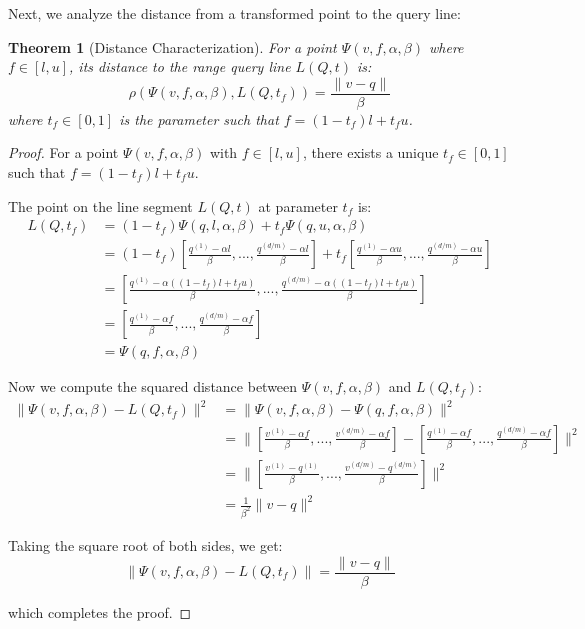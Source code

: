 \documentclass[numbers,sort]{article}
\newtheorem{theorem}{Theorem}
\begin{document}
Next, we analyze the distance from a transformed point to the query line:

\begin{theorem}[Distance Characterization]
\label{thm:distance-characterization}
For a point $\Psi(v, f, \alpha, \beta)$ where $f \in [l, u]$, its distance to the range query line $L(Q, t)$ is:
\begin{equation}
\rho(\Psi(v, f, \alpha, \beta), L(Q, t_f)) = \frac{\|v - q\|}{\beta}
\end{equation}
where $t_f \in [0,1]$ is the parameter such that $f = (1-t_f)l + t_f u$.
\end{theorem}

\begin{proof}
For a point $\Psi(v, f, \alpha, \beta)$ with $f \in [l, u]$, there exists a unique $t_f \in [0,1]$ such that $f = (1-t_f)l + t_f u$.

The point on the line segment $L(Q, t)$ at parameter $t_f$ is:
\begin{align}
L(Q, t_f) &= (1-t_f)\Psi(q, l, \alpha, \beta) + t_f\Psi(q, u, \alpha, \beta) \\
&= (1-t_f)[\frac{q^{(1)} - \alpha l}{\beta}, ..., \frac{q^{(d/m)} - \alpha l}{\beta}] + t_f[\frac{q^{(1)} - \alpha u}{\beta}, ..., \frac{q^{(d/m)} - \alpha u}{\beta}] \\
&= [\frac{q^{(1)} - \alpha((1-t_f)l + t_f u)}{\beta}, ..., \frac{q^{(d/m)} - \alpha((1-t_f)l + t_f u)}{\beta}] \\
&= [\frac{q^{(1)} - \alpha f}{\beta}, ..., \frac{q^{(d/m)} - \alpha f}{\beta}] \\
&= \Psi(q, f, \alpha, \beta)
\end{align}

Now we compute the squared distance between $\Psi(v, f, \alpha, \beta)$ and $L(Q, t_f)$:
\begin{align}
\|\Psi(v, f, \alpha, \beta) - L(Q, t_f)\|^2 &= \|\Psi(v, f, \alpha, \beta) - \Psi(q, f, \alpha, \beta)\|^2 \\
&= \|[\frac{v^{(1)} - \alpha f}{\beta}, ..., \frac{v^{(d/m)} - \alpha f}{\beta}] - [\frac{q^{(1)} - \alpha f}{\beta}, ..., \frac{q^{(d/m)} - \alpha f}{\beta}]\|^2 \\
&= \|[\frac{v^{(1)} - q^{(1)}}{\beta}, ..., \frac{v^{(d/m)} - q^{(d/m)}}{\beta}]\|^2 \\
&= \frac{1}{\beta^2}\|v - q\|^2
\end{align}

Taking the square root of both sides, we get:
\begin{equation}
\|\Psi(v, f, \alpha, \beta) - L(Q, t_f)\| = \frac{\|v - q\|}{\beta}
\end{equation}

which completes the proof.
\end{proof}
\end{document}
